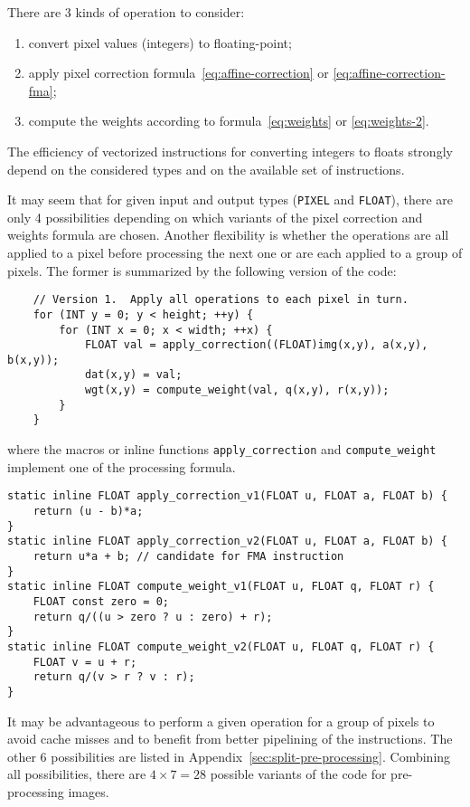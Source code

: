 \documentclass[10pt]{article}
\begin{document}
There are 3 kinds of operation to consider:
\begin{enumerate}
\item convert pixel values (integers) to floating-point;
\item apply pixel correction formula~\eqref{eq:affine-correction} or
  \eqref{eq:affine-correction-fma};
\item compute the weights according to formula~\eqref{eq:weights} or
  \eqref{eq:weights-2}.
\end{enumerate}
The efficiency of vectorized instructions for converting integers to
floats strongly depend on the considered types and on the available set
of instructions.

It may seem that for given input and output types (\verb+PIXEL+ and
\verb+FLOAT+), there are only 4 possibilities depending on which
variants of the pixel correction and weights formula are chosen.
Another flexibility is whether the operations are all applied to a
pixel before processing the next one or are each applied to a group of
pixels.  The former is summarized by the following version of the code:
\begin{verbatim}
    // Version 1.  Apply all operations to each pixel in turn.
    for (INT y = 0; y < height; ++y) {
        for (INT x = 0; x < width; ++x) {
            FLOAT val = apply_correction((FLOAT)img(x,y), a(x,y), b(x,y));
            dat(x,y) = val;
            wgt(x,y) = compute_weight(val, q(x,y), r(x,y));
        }
    }
\end{verbatim}
where the macros or inline functions \verb+apply_correction+ and
\verb+compute_weight+ implement one of the processing formula.

\begin{verbatim}
static inline FLOAT apply_correction_v1(FLOAT u, FLOAT a, FLOAT b) {
    return (u - b)*a;
}
static inline FLOAT apply_correction_v2(FLOAT u, FLOAT a, FLOAT b) {
    return u*a + b; // candidate for FMA instruction
}
static inline FLOAT compute_weight_v1(FLOAT u, FLOAT q, FLOAT r) {
    FLOAT const zero = 0;
    return q/((u > zero ? u : zero) + r);
}
static inline FLOAT compute_weight_v2(FLOAT u, FLOAT q, FLOAT r) {
    FLOAT v = u + r;
    return q/(v > r ? v : r);
}
\end{verbatim}

It may be advantageous to perform a given operation for a group of
pixels to avoid cache misses and to benefit from better pipelining of
the instructions.  The other 6 possibilities are listed in
Appendix~\ref{sec:split-pre-processing}.  Combining all possibilities,
there are $4\times7 = 28$ possible variants of the code for
pre-processing images.
\end{document}
